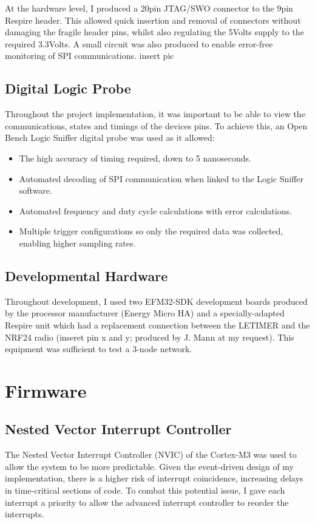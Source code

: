At the hardware level, I produced a 20pin JTAG/SWO connector to the 9pin Respire header. This
allowed quick insertion and removal of connectors without damaging the fragile header pins, whilst
also regulating the 5Volts supply to the required 3.3Volts. A small circuit was also produced to
enable error-free monitoring of SPI communications.
{insert pic}


\subsection{Digital Logic Probe}
Throughout the project implementation, it was important to be able to view the communications,
states and timings of the devices pins. To achieve this, an Open Bench Logic Sniffer digital probe was
used as it allowed:
\begin{itemize}
  \item The high accuracy of timing required, down to 5 nanoseconds.
  \item Automated decoding of SPI communication when linked to the Logic Sniffer software.
  \item Automated frequency and duty cycle calculations with error calculations.
  \item Multiple trigger configurations so only the required data was collected, enabling higher
        sampling rates.
\end{itemize}

\subsection{Developmental Hardware}
Throughout development, I used two EFM32-SDK development boards produced by the processor
manufacturer (Energy Micro HA) and a specially-adapted Respire unit which had a replacement
connection between the LETIMER and the NRF24 radio (inseret pin x and y; produced by J. Mann at
my request). This equipment was sufficient to test a 3-node network.

\section{Firmware}

\subsection{Nested Vector Interrupt Controller}
The Nested Vector Interrupt Controller (NVIC) of the Cortex-M3 was used to allow the system to be
more predictable. Given the event-driven design of my implementation, there is a higher risk of
interrupt coincidence, increasing delays in time-critical sections of code. To combat this potential
issue, I gave each interrupt a priority to allow the advanced interrupt controller to reorder the
interrupts.

